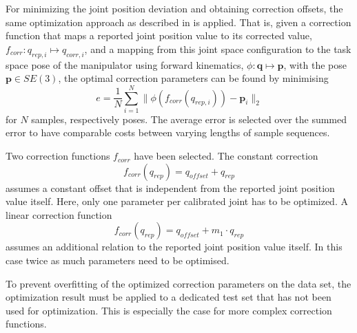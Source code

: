 For minimizing the joint position deviation and obtaining correction offsets, the same optimization approach as described in \cite{Fallon2015} is applied. That is, given a correction function that maps a reported joint position value to its corrected value, $f_{corr}: q_{rep,i} \mapsto q_{corr,i}$, and a mapping from this joint space configuration to the 	task space pose of the manipulator using forward kinematics, $\phi: \mathbf{q} \mapsto \mathbf{p}$, with the pose $\mathbf{p} \in SE(3)$, the optimal correction parameters can be found by minimising
\begin{equation}
e = \frac{1}{N} \sum_{i=1}^N  \lVert \phi \left( f_{corr}(q_{rep,i}) \right) - \mathbf{p}_i \rVert_2
\end{equation}
for $N$ samples, respectively poses. The average error is selected over the summed error to have comparable costs between varying lengths of sample sequences.

Two correction functions $f_{corr}$ have been selected. The constant correction
\begin{equation}
f_{corr}(q_{rep}) = q_{offset} + q_{rep}
\end{equation}
assumes a constant offset that is independent from the reported joint position value itself. Here, only one parameter per calibrated joint has to be optimized. A linear correction function
\begin{equation}
f_{corr}(q_{rep}) = q_{offset} + m_1 \cdot q_{rep}
\end{equation}
assumes an additional relation to the reported joint position value itself. In this case twice as much parameters need to be optimised.

To prevent overfitting of the optimized correction parameters on the data set, the optimization result must be applied to a dedicated test set that has not been used for optimization. This is especially the case for more complex correction functions.
